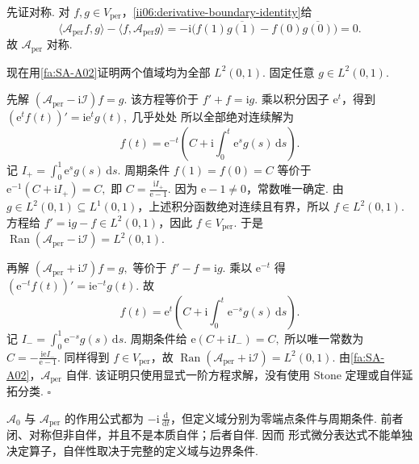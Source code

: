 \begin{FAProof}
先证对称. 对 \(\displaystyle f,g\in V_{\mathrm{per}}\)，\autoref{ii06:derivative-boundary-identity}给
\[
\langle\mathcal A_{\mathrm{per}}f,g\rangle
-
\langle f,\mathcal A_{\mathrm{per}}g\rangle
=
-\mathrm{i}\bigl(f(1)\overline{g(1)}-f(0)\overline{g(0)}\bigr)
=
0.
\]
故 \(\displaystyle\mathcal A_{\mathrm{per}}\) 对称.

现在用\autoref{fa:SA-A02}证明两个值域均为全部 \(\displaystyle L^2(0,1)\). 固定任意 \(\displaystyle g\in L^2(0,1)\).

先解
\(\displaystyle (\mathcal A_{\mathrm{per}}-\mathrm{i}\mathcal I)f=g.\)
该方程等价于
\(\displaystyle f'+f=\mathrm{i}g.\)
乘以积分因子 \(\displaystyle\mathrm{e}^t\)，得到
\(\displaystyle (\mathrm{e}^t f(t))' = \mathrm{i}\mathrm{e}^t g(t) ,\;\text{几乎处处}\)
所以全部绝对连续解为
\[
f(t)
=
\mathrm{e}^{-t}
\left(
C+
\mathrm{i}\int_0^t\mathrm{e}^{s}g(s)\,\mathrm{d}s
\right).
\]
记 \(\displaystyle I_+=\int_0^1\mathrm{e}^{s}g(s)\,\mathrm{d}s\). 周期条件 \(\displaystyle f(1)=f(0)=C\) 等价于
\(\displaystyle \mathrm{e}^{-1}(C+\mathrm{i}I_+)=C,\)
即
\(\displaystyle C = \frac{\mathrm{i}I_+}{\mathrm{e}-1}.\)
因为 \(\displaystyle\mathrm{e}-1\neq0\)，常数唯一确定. 由 \(\displaystyle g\in L^2(0,1)\subseteq L^1(0,1)\)，上述积分函数绝对连续且有界，所以 \(\displaystyle f\in L^2(0,1)\). 方程给 \(\displaystyle f'=\mathrm{i}g-f\in L^2(0,1)\)，因此 \(\displaystyle f\in V_{\mathrm{per}}\). 于是
\(\displaystyle \operatorname{Ran}(\mathcal A_{\mathrm{per}}-\mathrm{i}\mathcal I) = L^2(0,1).\)

再解
\(\displaystyle (\mathcal A_{\mathrm{per}}+\mathrm{i}\mathcal I)f=g,\)
等价于
\(\displaystyle f'-f=\mathrm{i}g.\)
乘以 \(\displaystyle\mathrm{e}^{-t}\) 得
\(\displaystyle (\mathrm{e}^{-t}f(t))' = \mathrm{i}\mathrm{e}^{-t}g(t).\)
故
\[
f(t)
=
\mathrm{e}^{t}
\left(
C+
\mathrm{i}\int_0^t\mathrm{e}^{-s}g(s)\,\mathrm{d}s
\right).
\]
记 \(\displaystyle I_-=\int_0^1\mathrm{e}^{-s}g(s)\,\mathrm{d}s\). 周期条件给
\(\displaystyle \mathrm{e}(C+\mathrm{i}I_-)=C,\)
所以唯一常数为
\(\displaystyle C = -\frac{\mathrm{i}\mathrm{e}I_-}{\mathrm{e}-1}.\)
同样得到 \(\displaystyle f\in V_{\mathrm{per}}\)，故
\(\displaystyle \operatorname{Ran}(\mathcal A_{\mathrm{per}}+\mathrm{i}\mathcal I) = L^2(0,1).\)
由\autoref{fa:SA-A02}，\(\displaystyle\mathcal A_{\mathrm{per}}\) 自伴. 该证明只使用显式一阶方程求解，没有使用 Stone 定理或自伴延拓分类.
\hfill\(\square\)
\end{FAProof}

\begin{FARemark}[相同微分表达式不决定算子]
\(\displaystyle\mathcal A_0\) 与 \(\displaystyle\mathcal A_{\mathrm{per}}\) 的作用公式都为 \(\displaystyle-\mathrm{i}\,\frac{\mathrm{d}}{\mathrm{d}t}\)，但定义域分别为零端点条件与周期条件. 前者闭、对称但非自伴，并且不是本质自伴；后者自伴. 因而 形式微分表达式不能单独决定算子，自伴性取决于完整的定义域与边界条件.
\end{FARemark}

